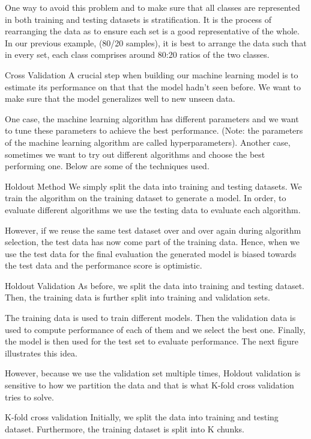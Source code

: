 One way to avoid this problem and to make sure that all classes are represented in both training and testing datasets is stratification. It is the process of rearranging the data as to ensure each set is a good representative of the whole. In our previous example, (80/20 samples), it is best to arrange the data such that in every set, each class comprises around 80:20 ratios of the two classes.

Cross Validation
A crucial step when building our machine learning model is to estimate its performance on that that the model hadn't seen before. We want to make sure that the model generalizes well to new unseen data.

One case, the machine learning algorithm has different parameters and we want to tune these parameters to achieve the best performance. (Note: the parameters of the machine learning algorithm are called hyperparameters). Another case, sometimes we want to try out different algorithms and choose the best performing one. Below are some of the techniques used.

Holdout Method
We simply split the data into training and testing datasets. We train the algorithm on the training dataset to generate a model. In order, to evaluate different algorithms we use the testing data to evaluate each algorithm.

However, if we reuse the same test dataset over and over again during algorithm selection, the test data has now come part of the training data. Hence, when we use the test data for the final evaluation the generated model is biased towards the test data and the performance score is optimistic.

Holdout Validation
As before, we split the data into training and testing dataset. Then, the training data is further split into training and validation sets.

The training data is used to train different models. Then the validation data is used to compute performance of each of them and we select the best one. Finally, the model is then used for the test set to evaluate performance. The next figure illustrates this idea.



However, because we use the validation set multiple times, Holdout validation is sensitive to how we partition the data and that is what K-fold cross validation tries to solve.

K-fold cross validation
Initially, we split the data into training and testing dataset. Furthermore, the training dataset is split into K chunks.

